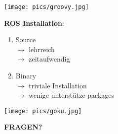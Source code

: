 \documentclass{beamer}
\begin{document}
\begin{frame}
\centerline{\texttt{[image: pics/groovy.jpg]}}
\end{frame}

\begin{frame}
{\bf ROS Installation}:
\begin{enumerate}
\item Source \\
$\rightarrow $ lehrreich \\
$\rightarrow $ zeitaufwendig \\
\item Binary \\
$\rightarrow $ triviale Installation \\
$\rightarrow $ wenige unterstütze packages \\
\end{enumerate}
\end{frame}

\begin{frame}
\centerline{\texttt{[image: pics/goku.jpg]}}
\vspace{2cm}
\centerline{{\bf \Huge FRAGEN?}}
\end{frame}
\end{document}
